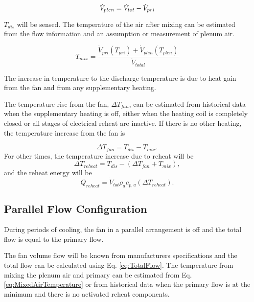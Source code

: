 \begin{equation} \label{eq:TotalFlow}
    \dot{V}_{plen} = \dot{V}_{tot} - \dot{V}_{pri}
\end{equation}

\(T_{dis}\) will be sensed. The temperature of the air after mixing can be estimated from the flow information and an assumption or measurement of plenum air. 


\begin{equation} \label{eq:MixedAirTemperature}
{T_{mix}} = \frac{{{{\dot V}_{pri}}\left( {{T_{pri}}} \right) + \dot V_{plen}\left( {{T_{plen}}} \right)}}{{{{\dot V}_{total}}}}
\end{equation}

The increase in temperature to the discharge temperature is due to heat gain from the fan and from any supplementary heating.

The temperature rise from the fan, \(\Delta T_{fan}\), can be estimated from historical data when the supplementary heating is off, either when the heating coil is completely closed or all stages of electrical reheat are inactive. If there is no other heating, the temperature increase from the fan is

\begin{equation}
\Delta {T_{fan}} = {T_{dis}} - {T_{mix}}.
\end{equation}
%
For other times, the temperature increase due to reheat will be
%
\begin{equation}
\Delta {T_{reheat}} = {T_{dis}} - \left( {\Delta {T_{fan}} + {T_{mix}}} \right),
\end{equation}
%
and the reheat energy will be
%
\begin{equation}
{\dot Q_{reheat}} = {\dot V_{tot}}{\rho _a}{c_{p,a}}\left( {\Delta {T_{reheat}}} \right).
\end{equation}

\subsection{Parallel Flow Configuration}

During periods of cooling, the fan in a parallel arrangement is off and the total flow is equal to the primary flow.

The fan volume flow will be known from manufacturers specifications and the total flow can be calculated using Eq. \eqref{eq:TotalFlow}. The temperature from mixing the plenum air and primary can be estimated from Eq. \eqref{eq:MixedAirTemperature} or from historical data when the primary flow is at the minimum and there is no activated reheat components.

